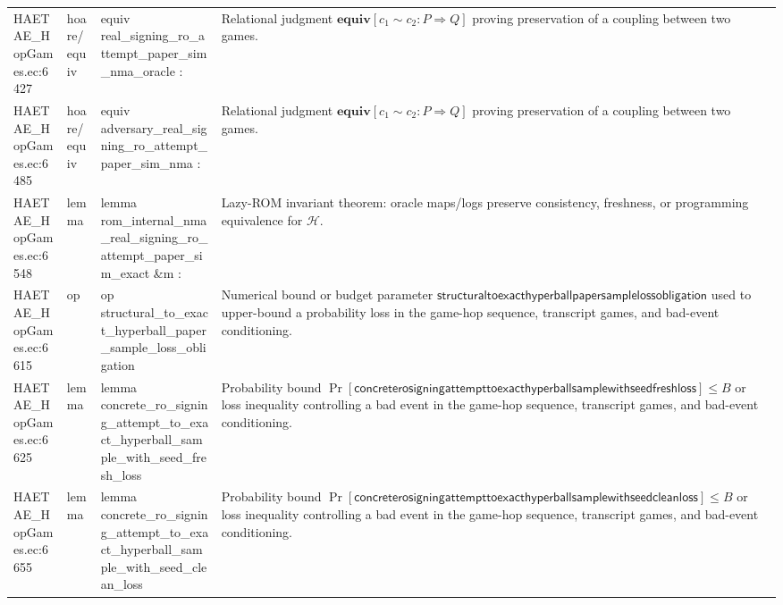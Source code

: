 \documentclass[10pt]{article}
\begin{document}
\begin{longtable}{L{0.11\textwidth}L{0.055\textwidth}L{0.385\textwidth}L{0.41\textwidth}}
HAETAE\_\allowbreak{}HopGames.\allowbreak{}ec:\allowbreak{}6427 & hoare/equiv & {\ttfamily\scriptsize equiv real\_\allowbreak{}signing\_\allowbreak{}ro\_\allowbreak{}attempt\_\allowbreak{}paper\_\allowbreak{}sim\_\allowbreak{}nma\_\allowbreak{}oracle :} & Relational judgment $\mathbf{equiv}[c_1\sim c_2:P\Rightarrow Q]$ proving preservation of a coupling between two games. \\
HAETAE\_\allowbreak{}HopGames.\allowbreak{}ec:\allowbreak{}6485 & hoare/equiv & {\ttfamily\scriptsize equiv adversary\_\allowbreak{}real\_\allowbreak{}signing\_\allowbreak{}ro\_\allowbreak{}attempt\_\allowbreak{}paper\_\allowbreak{}sim\_\allowbreak{}nma :} & Relational judgment $\mathbf{equiv}[c_1\sim c_2:P\Rightarrow Q]$ proving preservation of a coupling between two games. \\
HAETAE\_\allowbreak{}HopGames.\allowbreak{}ec:\allowbreak{}6548 & lemma & {\ttfamily\scriptsize lemma rom\_\allowbreak{}internal\_\allowbreak{}nma\_\allowbreak{}real\_\allowbreak{}signing\_\allowbreak{}ro\_\allowbreak{}attempt\_\allowbreak{}paper\_\allowbreak{}sim\_\allowbreak{}exact \&m :} & Lazy-ROM invariant theorem: oracle maps/logs preserve consistency, freshness, or programming equivalence for $\mathcal H$. \\
HAETAE\_\allowbreak{}HopGames.\allowbreak{}ec:\allowbreak{}6615 & op & {\ttfamily\scriptsize op structural\_\allowbreak{}to\_\allowbreak{}exact\_\allowbreak{}hyperball\_\allowbreak{}paper\_\allowbreak{}sample\_\allowbreak{}loss\_\allowbreak{}obligation} & Numerical bound or budget parameter $\mathsf{structuraltoexacthyperballpapersamplelossobligation}$ used to upper-bound a probability loss in the game-hop sequence, transcript games, and bad-event conditioning. \\
HAETAE\_\allowbreak{}HopGames.\allowbreak{}ec:\allowbreak{}6625 & lemma & {\ttfamily\scriptsize lemma concrete\_\allowbreak{}ro\_\allowbreak{}signing\_\allowbreak{}attempt\_\allowbreak{}to\_\allowbreak{}exact\_\allowbreak{}hyperball\_\allowbreak{}sample\_\allowbreak{}with\_\allowbreak{}seed\_\allowbreak{}fresh\_\allowbreak{}loss} & Probability bound $\Pr[\mathsf{concreterosigningattempttoexacthyperballsamplewithseedfreshloss}]\le B$ or loss inequality controlling a bad event in the game-hop sequence, transcript games, and bad-event conditioning. \\
HAETAE\_\allowbreak{}HopGames.\allowbreak{}ec:\allowbreak{}6655 & lemma & {\ttfamily\scriptsize lemma concrete\_\allowbreak{}ro\_\allowbreak{}signing\_\allowbreak{}attempt\_\allowbreak{}to\_\allowbreak{}exact\_\allowbreak{}hyperball\_\allowbreak{}sample\_\allowbreak{}with\_\allowbreak{}seed\_\allowbreak{}clean\_\allowbreak{}loss} & Probability bound $\Pr[\mathsf{concreterosigningattempttoexacthyperballsamplewithseedcleanloss}]\le B$ or loss inequality controlling a bad event in the game-hop sequence, transcript games, and bad-event conditioning. \\

\end{longtable}
\end{document}
